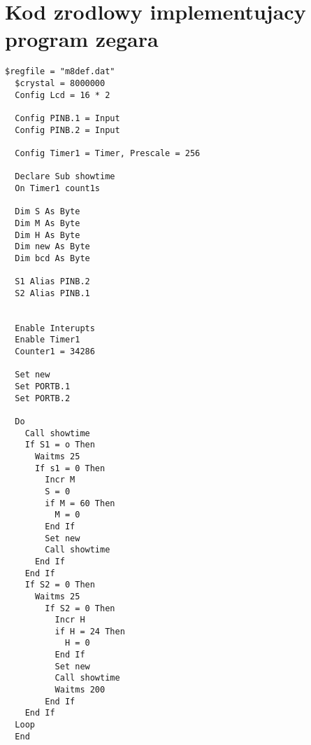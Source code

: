 \documentclass{article}
\begin{document}
\section{Kod zrodlowy implementujacy program zegara}


\begin{lstlisting}[language=VBScript , caption=Implementacja zegara oparteg ona przerwaniach]
  $regfile = "m8def.dat"
  $crystal = 8000000
  Config Lcd = 16 * 2

  Config PINB.1 = Input
  Config PINB.2 = Input

  Config Timer1 = Timer, Prescale = 256

  Declare Sub showtime
  On Timer1 count1s

  Dim S As Byte
  Dim M As Byte
  Dim H As Byte
  Dim new As Byte
  Dim bcd As Byte

  S1 Alias PINB.2
  S2 Alias PINB.1


  Enable Interupts 
  Enable Timer1
  Counter1 = 34286

  Set new 
  Set PORTB.1
  Set PORTB.2

  Do
    Call showtime
    If S1 = o Then
      Waitms 25
      If s1 = 0 Then
        Incr M
        S = 0
        if M = 60 Then
          M = 0
        End If
        Set new
        Call showtime
      End If
    End If
    If S2 = 0 Then
      Waitms 25
        If S2 = 0 Then
          Incr H
          if H = 24 Then
            H = 0
          End If
          Set new
          Call showtime
          Waitms 200
        End If
    End If
  Loop
  End
\end{lstlisting}
\end{document}
